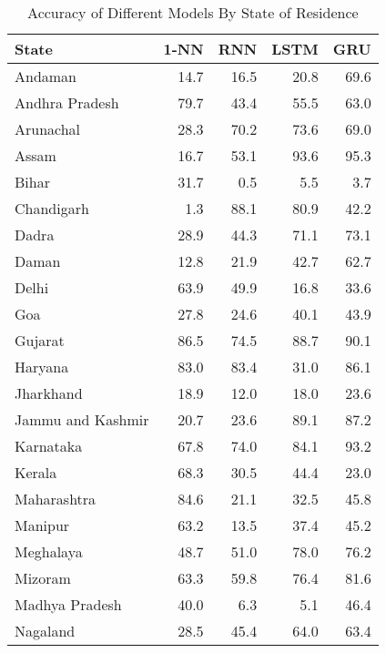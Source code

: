 \begin{table}
\centering
\caption{Accuracy of Different Models By State of Residence}
\label{accuracy_by_state}
\begin{tabular}{lrrrr}
\toprule
State & 1-NN & RNN & LSTM & GRU \\
\midrule
Andaman & 14.7 & 16.5 & 20.8 & 69.6 \\
Andhra Pradesh & 79.7 & 43.4 & 55.5 & 63.0 \\
Arunachal & 28.3 & 70.2 & 73.6 & 69.0 \\
Assam & 16.7 & 53.1 & 93.6 & 95.3 \\
Bihar & 31.7 & 0.5 & 5.5 & 3.7 \\
Chandigarh & 1.3 & 88.1 & 80.9 & 42.2 \\
Dadra & 28.9 & 44.3 & 71.1 & 73.1 \\
Daman & 12.8 & 21.9 & 42.7 & 62.7 \\
Delhi & 63.9 & 49.9 & 16.8 & 33.6 \\
Goa & 27.8 & 24.6 & 40.1 & 43.9 \\
Gujarat & 86.5 & 74.5 & 88.7 & 90.1 \\
Haryana & 83.0 & 83.4 & 31.0 & 86.1 \\
Jharkhand & 18.9 & 12.0 & 18.0 & 23.6 \\
Jammu and Kashmir & 20.7 & 23.6 & 89.1 & 87.2 \\
Karnataka & 67.8 & 74.0 & 84.1 & 93.2 \\
Kerala & 68.3 & 30.5 & 44.4 & 23.0 \\
Maharashtra & 84.6 & 21.1 & 32.5 & 45.8 \\
Manipur & 63.2 & 13.5 & 37.4 & 45.2 \\
Meghalaya & 48.7 & 51.0 & 78.0 & 76.2 \\
Mizoram & 63.3 & 59.8 & 76.4 & 81.6 \\
Madhya Pradesh & 40.0 & 6.3 & 5.1 & 46.4 \\
Nagaland & 28.5 & 45.4 & 64.0 & 63.4 \\
\bottomrule
\end{tabular}
\end{table}
